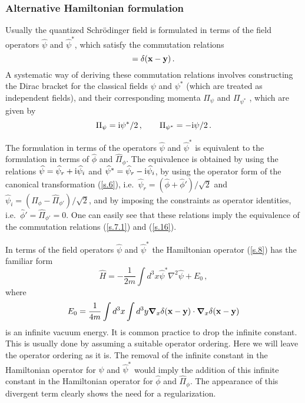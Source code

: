 \documentclass[12pt]{article}
\def\ii{\textrm i}
\begin{document}
\subsubsection{Alternative Hamiltonian formulation}
Usually the quantized Schr{\"o}\-ding\-er field is formulated in terms of the field operators ${\widehat \psi}$ and ${\widehat \psi^*}$, which satisfy the commutation relations
\begin{equation}
[{\widehat \psi}({\bf x}),{\widehat \psi^*}({\bf y})] = \delta({\bf x}-{\bf y}) \,.
\label{s.16}
\end{equation}
A systematic way of deriving these commutation relations involves constructing the Dirac bracket for the classical fields $\psi$ and $\psi^*$ (which are treated as independent fields), and their corresponding momenta $\Pi_{\psi}$ and $\Pi_{\psi^*}$  \cite{gergely02}, which are given by 
\begin{equation}
\Pi_{\psi}=\ii\psi^*/2\,, \qquad \Pi_{\psi^*}=-\ii\psi/2\,.
\label{s.15.1}
\end{equation}

The formulation in terms of the operators  ${\widehat \psi}$ and ${\widehat \psi^*}$ is equivalent to the formulation in terms of $\widehat{\phi}$ and $\widehat{\Pi}_{\phi}$. The equivalence is obtained by using the relations ${\widehat \psi}={\widehat \psi}_r +\ii {\widehat \psi}_i$ and ${\widehat \psi^*}={\widehat \psi}_r - \ii {\widehat \psi}_i$, by using the operator form of the canonical transformation (\ref{s.6}), i.e.\ ${\widehat \psi}_r=(\widehat{\phi} + \widehat{\phi}')/ \sqrt{2}$ and ${\widehat \psi}_i =(\widehat{\Pi}_{\phi} - \widehat{\Pi}_{\phi'}) / \sqrt{2}$, and by imposing the constraints as operator identities, i.e.\ $\widehat{\phi}' =\widehat{\Pi}_{\phi'}=0$. One can easily see that these relations imply the equivalence of the commutation relations (\ref{s.7.1}) and (\ref{s.16}).

In terms of the field operators ${\widehat \psi}$ and ${\widehat \psi^*}$ the Hamiltonian operator (\ref{s.8}) has the familiar form
\begin{equation}
{\widehat H} =  -\frac{1}{2m} \int d^3 x {\widehat \psi^*}\nabla^2 {\widehat \psi} + E_0 \,,
\label{s.17}
\end{equation}
where
\begin{equation}
E_0= \frac{1}{4m} \int d^3 x \int d^3 y {\boldsymbol \nabla}_x \delta({\bf x}-{\bf y}) \cdot {\boldsymbol \nabla}_x \delta({\bf x}-{\bf y}) 
\label{s.18}
\end{equation}
is an infinite vacuum energy. It is common practice to drop the infinite constant. This is usually done by assuming a suitable operator ordering. Here we will leave the operator ordering as it is. The removal of the infinite constant in the Hamiltonian operator for ${\widehat \psi}$ and ${\widehat \psi^*}$ would imply the addition of this infinite constant in the Hamiltonian operator for $\widehat{\phi}$ and $\widehat{\Pi}_{\phi}$. The appearance of this divergent term clearly shows the need for a regularization. 
\end{document}

